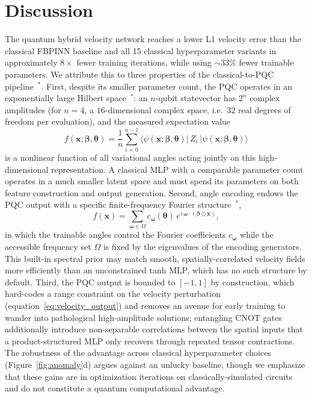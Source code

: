 \documentclass[11pt,a4paper]{article}
\newcommand{\newcite}[1]{\textcolor{todoRed}{$^{\ast}$}\citep{#1}}
\begin{document}
\section{Discussion}\label{sec:discussion}

The quantum hybrid velocity network reaches a lower L1 velocity error than the classical FBPINN baseline and all 15 classical hyperparameter variants in approximately $8\times$ fewer training iterations, while using $\sim$$33$\% fewer trainable parameters. We attribute this to three properties of the classical-to-PQC pipeline~\newcite{cerezo2021variational}. First, despite its smaller parameter count, the PQC operates in an exponentially large Hilbert space~\newcite{havlicek2019supervised,huang2021power}: an $n$-qubit statevector has $2^n$ complex amplitudes (for $n=4$, a $16$-dimensional complex space, i.e.\ $32$ real degrees of freedom per evaluation), and the measured expectation value
\begin{equation}
    f(\mathbf{x};\boldsymbol{\beta},\boldsymbol{\theta}) = \frac{1}{n}\sum_{i=0}^{n-1} \langle\psi(\mathbf{x};\boldsymbol{\beta},\boldsymbol{\theta})|\,Z_i\,|\psi(\mathbf{x};\boldsymbol{\beta},\boldsymbol{\theta})\rangle
\end{equation}
is a nonlinear function of all variational angles acting jointly on this high-dimensional representation. A classical MLP with a comparable parameter count operates in a much smaller latent space and must spend its parameters on both feature construction and output generation. Second, angle encoding endows the PQC output with a specific finite-frequency Fourier structure~\newcite{schuld2021effect},
\begin{equation}
    f(\mathbf{x}) = \sum_{\boldsymbol{\omega}\in\Omega} c_{\boldsymbol{\omega}}(\boldsymbol{\theta})\, e^{i\,\boldsymbol{\omega}\cdot(\boldsymbol{\beta}\odot\mathbf{x})},
\end{equation}
in which the trainable angles control the Fourier coefficients $c_{\boldsymbol{\omega}}$ while the accessible frequency set $\Omega$ is fixed by the eigenvalues of the encoding generators. This built-in spectral prior may match smooth, spatially-correlated velocity fields more efficiently than an unconstrained tanh MLP, which has no such structure by default. Third, the PQC output is bounded to $[-1, 1]$ by construction, which hard-codes a range constraint on the velocity perturbation (equation~\ref{eq:velocity_output}) and removes an avenue for early training to wander into pathological high-amplitude solutions; entangling CNOT gates additionally introduce non-separable correlations between the spatial inputs that a product-structured MLP only recovers through repeated tensor contractions. The robustness of the advantage across classical hyperparameter choices (Figure~\ref{fig:anomaly}d) argues against an unlucky baseline, though we emphasize that these gains are in optimization iterations on classically-simulated circuits and do not constitute a quantum computational advantage.
\end{document}
